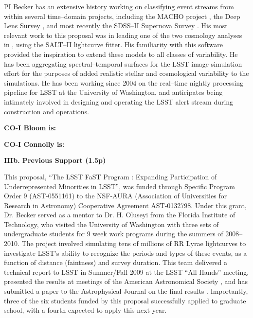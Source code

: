 PI Becker has an extensive history working on classifying event streams from
within several time--domain projects, including the MACHO project
\citep{2000PhDT.......258B}, the Deep Lens Survey \citep{2004ApJ...611..418B},
and most recently the SDSS--II Supernova Survey
\citep{2008AJ....135..338F,2008AJ....135..348S}.  His most relevant work to this
proposal was in leading one of the two cosmology analyses in
\cite{2009ApJS..185...32K}, using the SALT--II lightcurve fitter.  His
familiarity with this software provided the inspiration to extend these models
to all classes of variability. He has been aggregating spectral--temporal
surfaces for the LSST image simulation effort \citep{2010SPIE.7738E..53C} for
the purposes of added realistic stellar and cosmological variability to the
simulations.  He has been working since 2004 on the real--time nightly
processing pipeline for LSST at the University of Washington, and anticipates
being intimately involved in designing and operating the LSST alert stream
during construction and operations.

 \smallskip

{\bf CO-I Bloom is:}

 \smallskip

{\bf CO-I Connolly is:}

\bigskip \centerline{\bf IIIb. Previous Support (1.5p)} \smallskip

\smallskip

This proposal, ``The LSST FaST Program : Expanding Participation of
Underrepresented Minorities in LSST'', was funded through Specific Program Order
9 (AST-0551161) to the NSF-AURA (Association of Universities for Research in
Astronomy) Cooperative Agreement AST-0132798.  Under this grant, Dr. Becker
served as a mentor to Dr. H. Oluseyi from the Florida Institute of Technology,
who visited the University of Washington with three sets of undergraduate
students for 9 week work programs during the summers of 2008--2010.  The project
involved simulating tens of millions of RR Lyrae lightcurves to investigate
LSST's ability to recognize the periods and types of these events, as a function
of distance (faintness) and survey duration.  This team delivered a technical
report to LSST in Summer/Fall 2009 at the LSST ``All Hands'' meeting, presented
the results at meetings of the American Astronomical Society
\citep{2011AAS...21725213O,2010AAS...21540118O,2009AAS...21346014O}, and has
submitted a paper to the Astrophysical Journal on the final results
\citep{RRLyrae}.  Importantly, three of the six students funded by this proposal
successfully applied to graduate school, with a fourth expected to apply this
next year.

